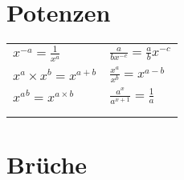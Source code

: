 \documentclass[../main.tex]{subfiles}
\begin{document}
\section{Potenzen}

\begin{tabularx}{1\textwidth} { 
    >{\centering\arraybackslash}X 
    >{\centering\arraybackslash}X  }
    \begin{math}
        x^{-a} = \frac{1}{x^a}
    \end{math}
    &
    \begin{math}
        \frac{a}{bx^{-c}} = \frac{a}{b}x^{-c}
    \end{math}
    \\ [7pt]
    \begin{math}
        x^a \times{x^b} = x^{a+b}
    \end{math}
    &
    \begin{math}
        \frac{x^a}{x^b} = x^{a-b}
    \end{math}
    \\ [7pt]
    \begin{math}
        {x^a}^b = x^{a \times{b}}
    \end{math}
    &
    \begin{math}
        \frac{a^x}{a^{x+1}} = \frac{1}{a}
    \end{math}
    \\ [7pt]
    \begin{math}
        {}
    \end{math}
    &
    \begin{math}
        {}
    \end{math}
    \\ [7pt]
    \begin{math}
        {}
    \end{math}
    &
    \begin{math}
        {}
    \end{math}
    \\ [7pt]
\end{tabularx}


\section{Brüche}
\end{document}
